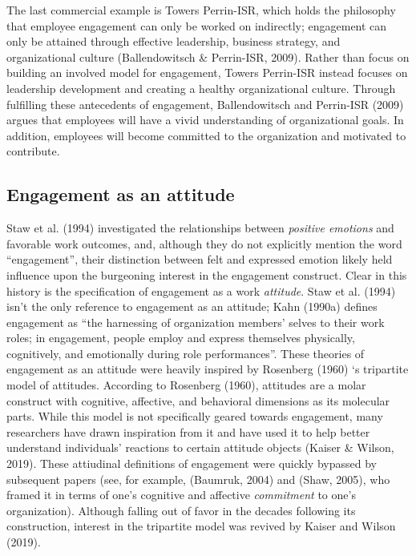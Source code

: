 \documentclass[
  man]{apa6}
\begin{document}
The last commercial example is Towers Perrin-ISR, which holds the philosophy that employee engagement can only be worked on indirectly; engagement can only be attained through effective leadership, business strategy, and organizational culture (Ballendowitsch \& Perrin-ISR, 2009). Rather than focus on building an involved model for engagement, Towers Perrin-ISR instead focuses on leadership development and creating a healthy organizational culture. Through fulfilling these antecedents of engagement, Ballendowitsch and Perrin-ISR (2009) argues that employees will have a vivid understanding of organizational goals. In addition, employees will become committed to the organization and motivated to contribute.

\hypertarget{engagement-as-an-attitude}{%
\subsection{Engagement as an attitude}\label{engagement-as-an-attitude}}

Staw et al. (1994) investigated the relationships between \emph{positive emotions} and favorable work outcomes, and, although they do not explicitly mention the word ``engagement'', their distinction between felt and expressed emotion likely held influence upon the burgeoning interest in the engagement construct. Clear in this history is the specification of engagement as a work \emph{attitude}. Staw et al. (1994) isn't the only reference to engagement as an attitude; Kahn (1990a) defines engagement as ``the harnessing of organization members' selves to their work roles; in engagement, people employ and express themselves physically, cognitively, and emotionally during role performances''. These theories of engagement as an attitude were heavily inspired by Rosenberg (1960) `s tripartite model of attitudes. According to Rosenberg (1960), attitudes are a molar construct with cognitive, affective, and behavioral dimensions as its molecular parts. While this model is not specifically geared towards engagement, many researchers have drawn inspiration from it and have used it to help better understand individuals' reactions to certain attitude objects (Kaiser \& Wilson, 2019). These attiudinal definitions of engagement were quickly bypassed by subsequent papers (see, for example, (Baumruk, 2004) and (Shaw, 2005), who framed it in terms of one's cognitive and affective \emph{commitment} to one's organization). Although falling out of favor in the decades following its construction, interest in the tripartite model was revived by Kaiser and Wilson (2019).
\end{document}
